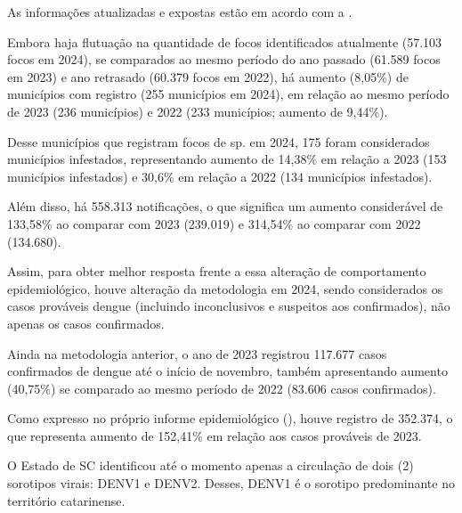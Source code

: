 

\indent As informações atualizadas e expostas estão em acordo com a .

\indent Embora haja flutuação na quantidade de focos identificados atualmente (57.103 focos em 2024), se comparados ao mesmo período do ano passado (61.589 focos em 2023) e ano retrasado (60.379 focos em 2022), há aumento (8,05\%) de municípios com registro (255 municípios em 2024), em relação ao mesmo período de 2023 (236 municípios) e 2022 (233 municípios; aumento de 9,44\%).

\indent Desse municípios que registram focos de  sp. em 2024, 175 foram considerados municípios infestados, representando aumento de 14,38\% em relação a 2023 (153 municípios infestados) e 30,6\% em relação a 2022 (134 municípios infestados).

\indent Além disso, há 558.313 notificações, o que significa um aumento considerável de 133,58\% ao comparar com 2023 (239.019) e 314,54\% ao comparar com 2022 (134.680).

\indent Assim, para obter melhor resposta frente a essa alteração de comportamento epidemiológico, houve alteração da metodologia em 2024, sendo considerados os casos prováveis dengue (incluindo inconclusivos e suspeitos aos confirmados), não apenas os casos confirmados.

\indent Ainda na metodologia anterior, o ano de 2023 registrou 117.677 casos confirmados de dengue até o início de novembro, também apresentando aumento (40,75\%) se comparado ao mesmo período de 2022 (83.606 casos confirmados).

\indent Como expresso no próprio informe epidemiológico (\citeyear{Informe30DiveSE/24}), houve registro de 352.374, o que representa aumento de 152,41\% em relação aos casos prováveis de 2023.

\indent O Estado de \acrlong{SC} identificou até o momento apenas a circulação de dois (2) sorotipos virais: \acrshort{DENV}1 e \acrshort{DENV}2. Desses, \acrshort{DENV}1 é o sorotipo predominante no território catarinense.

